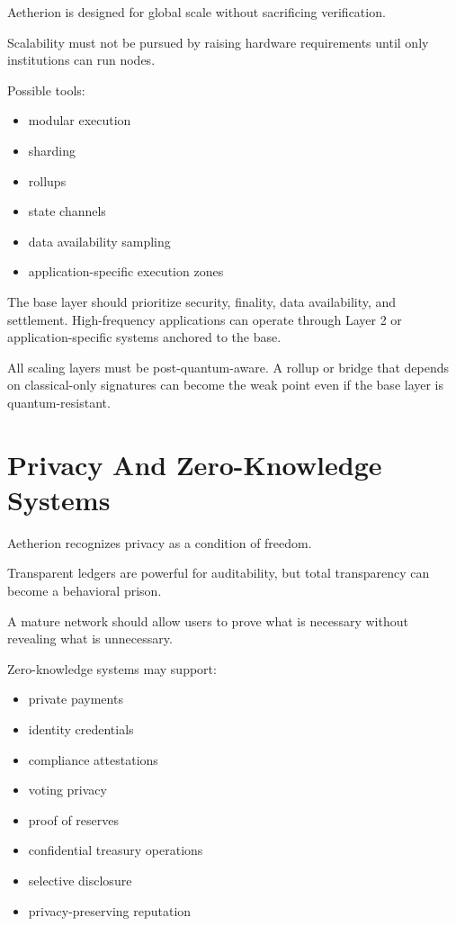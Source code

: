 ﻿\documentclass[12pt]{article}
\begin{document}
Aetherion is designed for global scale without sacrificing verification.

Scalability must not be pursued by raising hardware requirements until only institutions can run nodes.

Possible tools:

\begin{itemize}
  \item modular execution
  \item sharding
  \item rollups
  \item state channels
  \item data availability sampling
  \item application-specific execution zones
\end{itemize}

The base layer should prioritize security, finality, data availability, and settlement. High-frequency applications can operate through Layer 2 or application-specific systems anchored to the base.

All scaling layers must be post-quantum-aware. A rollup or bridge that depends on classical-only signatures can become the weak point even if the base layer is quantum-resistant.

\section{Privacy And Zero-Knowledge Systems}


Aetherion recognizes privacy as a condition of freedom.

Transparent ledgers are powerful for auditability, but total transparency can become a behavioral prison.

A mature network should allow users to prove what is necessary without revealing what is unnecessary.

Zero-knowledge systems may support:

\begin{itemize}
  \item private payments
  \item identity credentials
  \item compliance attestations
  \item voting privacy
  \item proof of reserves
  \item confidential treasury operations
  \item selective disclosure
  \item privacy-preserving reputation
\end{itemize}
\end{document}
